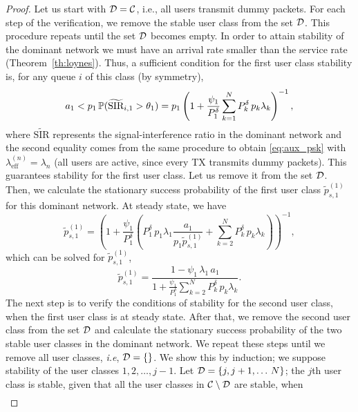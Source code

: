 \begin{proof}
    Let us start with $\cal{D}=\cal{C}$, i.e., all users transmit dummy packets. For each step of the verification, we remove the stable user class from the set $\cal{D}$. This procedure repeats until the set $\cal{D}$ becomes empty. In order to attain stability of the dominant network we must have an arrival rate smaller than the service rate (Theorem~\ref{th:loynes}). Thus, a sufficient condition for the first user class stability is, for any queue $i$ of this class (by symmetry),
    \begin{equation*}
    	a_1 < p_1\,\P(\widetilde{\text{SIR}}_{i,1} > \theta_1) = p_1 \left( 1 + \dfrac{\psi_1}{P_1^\delta} \sum_{k=1}^N P_k^\delta\,p_k\lambda_k \right)^{-1},
    \end{equation*}
    where $\widetilde{\text{SIR}}$ represents the signal-interference ratio in the dominant network and the second equality comes from the same procedure to obtain \eqref{eq:aux_psk} with $\lambda_\mathrm{eff}^{(n)} = \lambda_n$ (all users are active, since every TX transmits dummy packets).
    This guarantees stability for the first user class. Let us remove it from the set $\cal{D}$. Then, we calculate the stationary success probability of the first user class $\widetilde{p}^{(1)}_{s,1}$ for this dominant network. At steady state, we have
    \begin{equation*}
    	\widetilde{p}^{(1)}_{s,1} = \left( 1 + \dfrac{\psi_1}{P_1^\delta} \left( P_1^\delta\,p_1\lambda_1\dfrac{a_1}{p_1\widetilde{p}^{(1)}_{s,1}} + \sum_{k=2}^N P_k^\delta\,p_k\lambda_k \right) \right)^{-1},
    \end{equation*}
    which can be solved for $\widetilde{p}^{(1)}_{s,1}$,
    \begin{equation*}
    	\widetilde{p}^{(1)}_{s,1} = \dfrac{1 - \psi_1\,\lambda_1\,a_1}{1 + \frac{\psi_1}{P_1^\delta} \sum_{k=2}^N P_k^\delta\,p_k\lambda_k}.
    \end{equation*}
    The next step is to verify the conditions of stability for the second user class, when the first user class is at steady state. After that, we remove the second user class from the set $\cal{D}$ and calculate the stationary success probability of the two stable user classes in the dominant network. We repeat these steps until we remove all user classes, \textit{i.e}, $\cal{D} = \{\}$. We show this by induction; we suppose stability of the user classes $1,2,\dots,j-1$. Let $\cal{D} = \{j,j+1,\dots\,N\}$; the $j$th user class is stable, given that all the user classes in $\cal{C}\setminus\cal{D}$ are stable, when
    \begin{align} \label{eq:aux_aj}

\end{align}
\end{proof}
